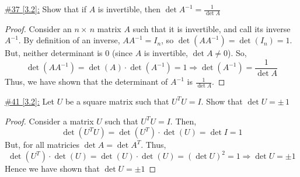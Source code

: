 \documentclass{exam}
\begin{document}
\underline{\#37 [3.2]:} Show that if $A$ is invertible, then $\det A^{-1} = \frac{1}{\det A}$
\begin{solution}
    \begin{proof}
        Consider an $n\times\,n$ matrix $A$ such that it is invertible, and call its inverse $A^{-1}$. By definition of an inverse, $AA^{-1} = I_{n}$, so $\det{\left(AA^{-1}\right)} = \det{\left(I_n\right)} = 1$. But, neither determinant is $0$ (since $A$ is invertible, $\det A \neq 0$). So,
        \[
            \det{\left(AA^{-1}\right)} = \det\left(A\right) \cdot \det\left(A^{-1}\right) = 1 \Rightarrow \det\left(A^{-1}\right) = \frac{1}{\det A}
        \]
        Thus, we have shown that the determinant of $A^{-1}$ is $\frac{1}{\det A}$.
    \end{proof}
\end{solution}

\underline{\#41 [3.2]:} Let $U$ be a square matrix such that $U^{T}U = I$. Show that $\det U = \pm\,1$
\begin{solution}
    \begin{proof}
        Consider a matrix $U$ such that $U^{T}U = I$. Then, 
        \[
            \det\left(U^{T}U\right) = \det\left(U^{T}\right) \cdot \det\left(U\right) = \det{I} = 1
        \]
        But, for all matricies $\det{A} = \det{A^{T}}$. Thus, 
        \[
            \det\left(U^{T}\right) \cdot \det\left(U\right) = \det\left(U\right) \cdot \det\left(U\right) = \left(\det{U}\right)^{2} = 1 \Rightarrow \det{U} = \pm 1
        \]
        Hence we have shown that $\det U = \pm 1$
    \end{proof}
\end{solution}
\end{document}
